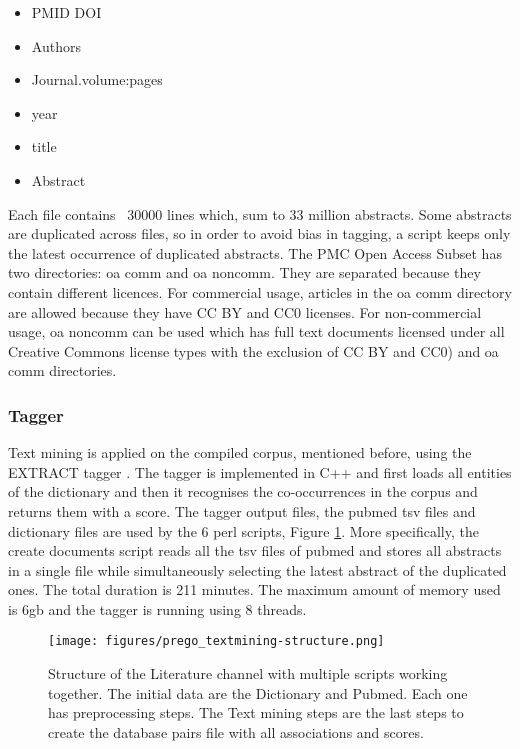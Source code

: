 \begin{itemize}
    \item PMID DOI
    \item Authors
    \item Journal.volume:pages
    \item year
    \item title
    \item Abstract
\end{itemize}

Each file contains ~30000 lines which, sum to 33 million abstracts. Some
abstracts are duplicated across files, so in order to avoid bias in tagging,
a script keeps only the latest occurrence of duplicated abstracts.
The PMC Open Access Subset has two directories: oa comm and oa noncomm.
They are separated because they contain different licences. For commercial usage,
articles in the oa comm directory are allowed because they have CC BY and CC0 licenses.
For non-commercial usage, oa noncomm can be used which has full text documents
licensed under all Creative Commons license types with the exclusion of CC BY and CC0)
and oa comm directories. 

   \subsubsection{Tagger}

Text mining is applied on the compiled corpus, mentioned before,
using the EXTRACT tagger \parencite{pafilis2016extract, jensen2016one}.
The tagger is implemented in C++ and first loads all entities of the dictionary
and then it recognises the co-occurrences in the corpus and returns them with a score. 
The tagger output files, the pubmed tsv files and dictionary files are used by
the 6 perl scripts, Figure \ref{fig:prego-textmining-structure}. More specifically, 
the create documents script reads all the tsv files of pubmed and stores all abstracts
in a single file while simultaneously selecting the latest abstract of the duplicated ones. 
The total duration is 211 minutes. The maximum amount of memory used is 6gb and the tagger
is running using 8 threads.
   
\begin{figure}[hbt!]
      \centering
      \texttt{[image: figures/prego\_textmining-structure.png]}
      \caption[PREGO analysis methodology]{
         Structure of the Literature channel with multiple scripts working together.
         The initial data are the Dictionary and Pubmed. Each one has preprocessing steps. 
         The Text mining steps are the last steps to create the database pairs file 
         with all associations and scores.
      }
      \label{fig:prego-textmining-structure}
\end{figure}

